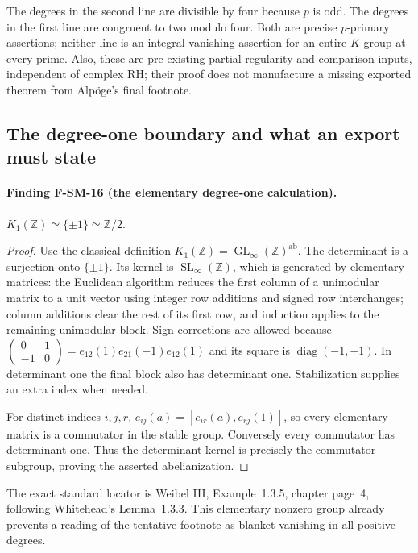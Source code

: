 \documentclass[11pt,a4paper]{article}
\theoremstyle{definition}\newtheorem{definition}[theorem]{Definition}
\theoremstyle{remark}\newtheorem{remark}[theorem]{Remark}
\begin{document}
The degrees in the second line are divisible by four because $p$ is
odd.  The degrees in the first line are congruent to two modulo four.
Both are precise $p$-primary assertions; neither line is an integral
vanishing assertion for an entire $K$-group at every prime.  Also, these
are pre-existing partial-regularity and comparison inputs, independent
of complex RH; their proof does not manufacture a missing exported
theorem from Alp\"oge's final footnote.

\subsection{The degree-one boundary and what an export must state}

\paragraph{Finding F-SM-16 (the elementary degree-one calculation).}
$K_1(\mathbb Z)\simeq\{\pm1\}\simeq\mathbb Z/2$.

\begin{proof}
Use the classical definition
$K_1(\mathbb Z)=\operatorname{GL}_\infty(\mathbb Z)^{\mathrm{ab}}$.
The determinant is a surjection onto $\{\pm1\}$.  Its kernel is
$\operatorname{SL}_\infty(\mathbb Z)$, which is generated by elementary
matrices: the Euclidean algorithm reduces the first column of a
unimodular matrix to a unit vector using integer row additions and signed
row interchanges; column additions clear the rest of its first row, and
induction applies to the remaining unimodular block.  Sign corrections
are allowed because
$\left(\begin{smallmatrix}0&1\\-1&0\end{smallmatrix}\right)
=e_{12}(1)e_{21}(-1)e_{12}(1)$ and its square is
$\operatorname{diag}(-1,-1)$.  In determinant one the final block also
has determinant one.  Stabilization supplies an extra index when needed.

For distinct indices $i,j,r$,
$e_{ij}(a)=[e_{ir}(a),e_{rj}(1)]$, so every elementary matrix is a
commutator in the stable group.  Conversely every commutator has
determinant one.  Thus the determinant kernel is precisely the
commutator subgroup, proving the asserted abelianization.
\end{proof}
The exact standard locator is Weibel III, Example~1.3.5, chapter
page~4, following Whitehead's Lemma~1.3.3.  This elementary nonzero
group already prevents a reading of the tentative footnote as blanket
vanishing in all positive degrees.
\end{document}
